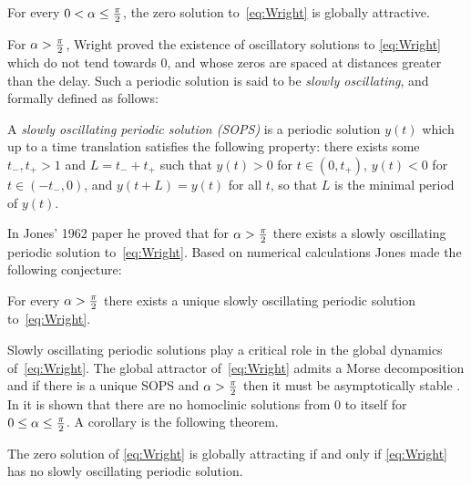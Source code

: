 \begin{conjecture}
	For every $0< \alpha \leq \tfrac{\pi}{2}  $, the zero solution to~\eqref{eq:Wright} is globally attractive. 
	\label{conj:ConjWright}
\end{conjecture}
For $ \alpha > \tfrac{\pi}{2}$, Wright proved the existence of oscillatory solutions to \eqref{eq:Wright} which do not tend towards $0$, and whose zeros are spaced at distances greater than the delay. 
Such a periodic solution is said to be \emph{slowly oscillating}, and formally defined as follows: 
\begin{definition}
	A \emph{slowly oscillating periodic solution (SOPS)}  is a periodic solution $y(t)$ which up to a time translation satisfies the following property: there exists some $t_{-}, t_{+} >1$ and $ L = t_{-} +t_{+} $ such that 
	$ y( t ) >0$ for $ t\in (0,t_{+})$,
	$y(t) < 0$ for $ t \in (-t_{-},0)$, 
	and $y(t+L) = y(t)$ for all $ t$,
	so that $ L $ is the minimal period of $y(t)$.  
\end{definition}



In Jones' 1962 paper \cite{jones1962existence} he proved that for $ \alpha > \tfrac{\pi}{2} $  there exists a  slowly oscillating periodic solution to~\eqref{eq:Wright}.  
Based on numerical calculations \cite{jones1962nonlinear}  Jones made the following conjecture: 



\begin{conjecture}
	For every $ \alpha > \tfrac{\pi}{2}  $ there exists a unique slowly oscillating periodic solution to~\eqref{eq:Wright}. 
	\label{conj:ConjJones}
\end{conjecture}

Slowly oscillating periodic solutions play a critical role in the global dynamics of~\eqref{eq:Wright}. 
The global attractor of~\eqref{eq:Wright} admits a Morse decomposition \cite{mccord1996global,mallet1988morse} and if there is a unique SOPS and $ \alpha > \tfrac{\pi}{2}$ then it must be asymptotically stable \cite{xie1991thesis,xie1993uniqueness}.  
In \cite{neumaier2014global} it is shown that there are no homoclinic solutions from $0$ to itself for $0 \leq   \alpha \leq \tfrac{\pi}{2}$. A corollary is the following theorem.
\begin{theorem}%
	\label{thm:AttractiveNonexistenceEquivalence}
	The zero solution of \eqref{eq:Wright} is globally attracting if and only if \eqref{eq:Wright}
	has no slowly oscillating periodic solution. 
\end{theorem}



